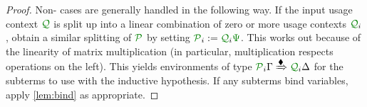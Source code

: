 \documentclass[submission,copyright,creativecommons]{eptcs}
\begin{document}
\begin{proof}
  Non- cases are generally handled in the following way.
  If the input usage context $\resctx Q$ is split up into a linear
  combination of zero or more usage contexts $\resctx Q_{i}$, obtain a
  similar splitting of $\resctx P$ by setting
  $\resctx P_{i} := \resctx Q_{i}\rescomment\Psi$.  This works out
  because of the linearity of matrix multiplication (in particular,
  multiplication respects operations on the left). This yields
  environments of type
  $\resctx P_{i}\Gamma \subst{\kitrel} \resctx Q_{i}\Delta$ for the
  subterms to use with the inductive hypothesis. If any subterms bind
  variables, apply \autoref{lem:bind} as appropriate.

\end{proof}
\end{document}
